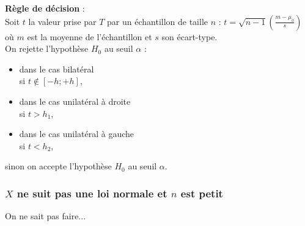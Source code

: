 \documentclass[a4paper,11pt]{book}
\begin{document}
{\bf R\`egle de d\'ecision} :\\
Soit  $t$  la valeur prise par $T$ par un \'echantillon de taille $n$ :
$\displaystyle t=\sqrt{n-1}(\frac{m-\mu_0}{s})$ o\`u $m$ est la moyenne de 
l'\'echantillon et $s$ son \'ecart-type.\\
On rejette l'hypoth\`ese $H_0$ au seuil $\alpha$ :
\begin{itemize}
\item dans le cas bilat\'eral\\ 
si $t\not\in [-h;+h]$, 
\item dans le cas unilat\'eral \`a droite\\
si $t>h_1$,
\item dans le cas unilat\'eral \`a gauche\\
si $t<h_2$, 
\end{itemize}
sinon on accepte l'hypoth\`ese $H_0$ au seuil $\alpha$.

\subsubsection{$X$ ne suit pas une loi normale  et  $n$ est  petit}
On ne sait pas faire...
\end{document}

